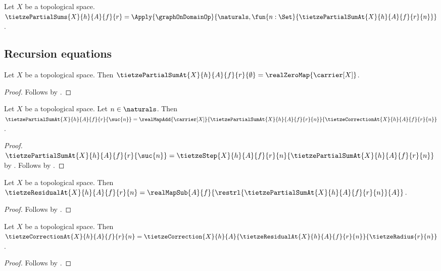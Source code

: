 \begin{definition}\label{tietze_partial_sums}
    Let $X$ be a topological space.
    $\tietzePartialSums{X}{h}{A}{f}{r}
        =\Apply{\graphOnDomainOp}{\naturals,
            \fun{n:\Set}{\tietzePartialSumAt{X}{h}{A}{f}{r}{n}}}$.
\end{definition}

\subsection{Recursion equations}

\begin{proposition}\label{tietze_partial_sum_zero}
    Let $X$ be a topological space.
    Then
        $\tietzePartialSumAt{X}{h}{A}{f}{r}{\emptyset}
            =\realZeroMap{\carrier[X]}$.
\end{proposition}
\begin{proof}
    Follows by
        .
\end{proof}

\begin{proposition}\label{tietze_partial_sum_successor}
    Let $X$ be a topological space.
    Let $n\in\naturals$.
    Then
        $\tietzePartialSumAt{X}{h}{A}{f}{r}{\suc{n}}
            =\realMapAdd{\carrier[X]}
                {\tietzePartialSumAt{X}{h}{A}{f}{r}{n}}
                {\tietzeCorrectionAt{X}{h}{A}{f}{r}{n}}$.
\end{proposition}
\begin{proof}
    $\tietzePartialSumAt{X}{h}{A}{f}{r}{\suc{n}}
        =\tietzeStep{X}{h}{A}{f}{r}{n}
            {\tietzePartialSumAt{X}{h}{A}{f}{r}{n}}$
        by
        .
    Follows by
        .
\end{proof}

\begin{proposition}\label{tietze_residual_at_eq}
    Let $X$ be a topological space.
    Then
        $\tietzeResidualAt{X}{h}{A}{f}{r}{n}
            =\realMapSub{A}{f}
                {\restrl{\tietzePartialSumAt{X}{h}{A}{f}{r}{n}}{A}}$.
\end{proposition}
\begin{proof}
    Follows by .
\end{proof}

\begin{proposition}\label{tietze_correction_at_eq}
    Let $X$ be a topological space.
    Then
        $\tietzeCorrectionAt{X}{h}{A}{f}{r}{n}
            =\tietzeCorrection{X}{h}{A}
                {\tietzeResidualAt{X}{h}{A}{f}{r}{n}}
                {\tietzeRadius{r}{n}}$.
\end{proposition}
\begin{proof}
    Follows by
        .
\end{proof}

